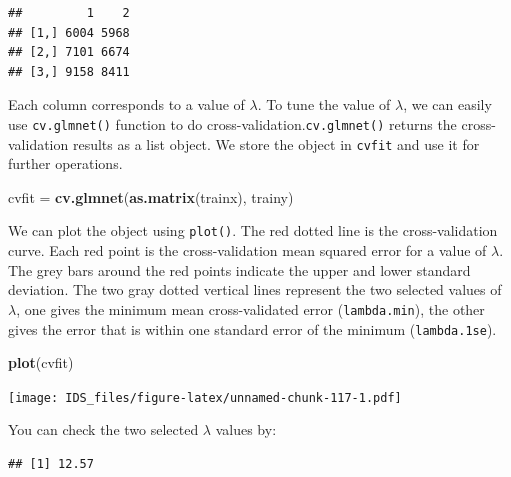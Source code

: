 \documentclass[12pt,]{krantz}
\makeatletter
\newenvironment{Shaded}{\begin{snugshade}}{\end{snugshade}}
\newcommand{\CommentTok}[1]{\textcolor[rgb]{0.37,0.37,0.37}{\textit{#1}}}
\newcommand{\FloatTok}[1]{\textcolor[rgb]{0.06,0.06,0.06}{#1}}
\newcommand{\KeywordTok}[1]{\textcolor[rgb]{0.27,0.27,0.27}{\textbf{#1}}}
\newcommand{\NormalTok}[1]{#1}
\newcommand{\OperatorTok}[1]{\textcolor[rgb]{0.43,0.43,0.43}{\textbf{#1}}}
\newcommand{\StringTok}[1]{\textcolor[rgb]{0.5,0.5,0.5}{#1}}
\newenvironment{kframe}{%
\medskip{}
\setlength{\fboxsep}{.8em}
 \def\at@end@of@kframe{}%
 \ifinner\ifhmode%
  \def\at@end@of@kframe{\end{minipage}}%
  \begin{minipage}{\columnwidth}%
 \fi\fi%
 \def\FrameCommand##1{\hskip\@totalleftmargin \hskip-\fboxsep
 \colorbox{shadecolor}{##1}\hskip-\fboxsep
     \hskip-\linewidth \hskip-\@totalleftmargin \hskip\columnwidth}%
 \MakeFramed {\advance\hsize-\width
   \@totalleftmargin\z@ \linewidth\hsize
   \@setminipage}}%
 {\par\unskip\endMakeFramed%
 \at@end@of@kframe}
\renewenvironment{Shaded}{\begin{kframe}}{\end{kframe}}
\makeatother
\begin{document}
\begin{verbatim}
##         1    2
## [1,] 6004 5968
## [2,] 7101 6674
## [3,] 9158 8411
\end{verbatim}

Each column corresponds to a value of \(\lambda\). To tune the value of \(\lambda\), we can easily use \texttt{cv.glmnet()} function to do cross-validation.\texttt{cv.glmnet()} returns the cross-validation results as a list object. We store the object in \texttt{cvfit} and use it for further operations.

\begin{Shaded}
\begin{Highlighting}[]
\NormalTok{cvfit =}\StringTok{ }\KeywordTok{cv.glmnet}\NormalTok{(}\KeywordTok{as.matrix}\NormalTok{(trainx), trainy)}
\end{Highlighting}
\end{Shaded}

We can plot the object using \texttt{plot()}. The red dotted line is the cross-validation curve. Each red point is the cross-validation mean squared error for a value of \(\lambda\). The grey bars around the red points indicate the upper and lower standard deviation. The two gray dotted vertical lines represent the two selected values of \(\lambda\), one gives the minimum mean cross-validated error (\texttt{lambda.min}), the other gives the error that is within one standard error of the minimum (\texttt{lambda.1se}).

\begin{Shaded}
\begin{Highlighting}[]
\KeywordTok{plot}\NormalTok{(cvfit)}
\end{Highlighting}
\end{Shaded}

\texttt{[image: IDS\_files/figure-latex/unnamed-chunk-117-1.pdf]}

You can check the two selected \(\lambda\) values by:

\begin{Shaded}
\end{Shaded}

\begin{verbatim}
## [1] 12.57
\end{verbatim}

\begin{Shaded}
\end{Shaded}
\end{document}
